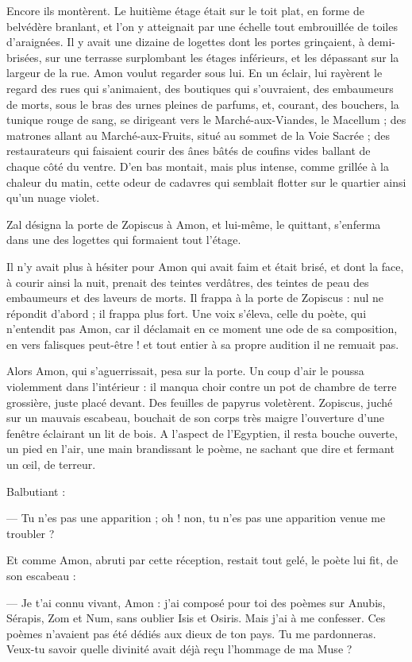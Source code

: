\documentclass[a4paper, 11pt, oneside, polutonikogreek, french]{article}
\begin{document}
Encore ils montèrent. Le huitième étage était sur le toit plat, en forme de belvédère branlant, et l'on y atteignait par une échelle tout embrouillée de toiles d'araignées. Il y avait une dizaine de logettes dont les portes grinçaient, à demi-brisées, sur une terrasse surplombant les étages inférieurs, et les dépassant sur la largeur de la rue. Amon voulut regarder sous lui. En un éclair, lui rayèrent le regard des rues qui s'animaient, des boutiques qui s'ouvraient, des embaumeurs de morts, sous le bras des urnes pleines de parfums, et, courant, des bouchers, la tunique rouge de sang, se dirigeant vers le Marché-aux-Viandes, le Macellum ; des matrones allant au Marché-aux-Fruits, situé au sommet de la Voie Sacrée ; des restaurateurs qui faisaient courir des ânes bâtés de coufins vides ballant de chaque côté du ventre. D'en bas montait, mais plus intense, comme grillée à la chaleur du matin, cette odeur de cadavres qui semblait flotter sur le quartier ainsi qu'un nuage violet.

Zal désigna la porte de Zopiscus à Amon, et lui-même, le quittant, s'enferma dans une des logettes qui formaient tout l'étage.

Il n'y avait plus à hésiter pour Amon qui avait faim et était brisé, et dont la face, à courir ainsi la nuit, prenait des teintes verdâtres, des teintes de peau des embaumeurs et des laveurs de morts. Il frappa à la porte de Zopiscus : nul ne répondit d'abord ; il frappa plus fort. Une voix s'éleva, celle du poète, qui n'entendit pas Amon, car il déclamait en ce moment une ode de sa composition, en vers falisques peut-être ! et tout entier à sa propre audition il ne remuait pas.

Alors Amon, qui s'aguerrissait, pesa sur la porte. Un coup d'air le poussa violemment dans l'intérieur : il manqua choir contre un pot de chambre de terre grossière, juste placé devant. Des feuilles de papyrus voletèrent. Zopiscus, juché sur un mauvais escabeau, bouchait de son corps très maigre l'ouverture d'une fenêtre éclairant un lit de bois. A l'aspect de l'Egyptien, il resta bouche ouverte, un pied en l'air, une main brandissant le poème, ne sachant que dire et fermant un œil, de terreur.

Balbutiant :

--- Tu n'es pas une apparition ; oh ! non, tu n'es pas une apparition venue me troubler ?

Et comme Amon, abruti par cette réception, restait tout gelé, le poète lui fit, de son escabeau :

--- Je t'ai connu vivant, Amon : j'ai composé pour toi des poèmes sur Anubis, Sérapis, Zom et Num, sans oublier Isis et Osiris. Mais j'ai à me confesser. Ces poèmes n'avaient pas été dédiés aux dieux de ton pays. Tu me pardonneras. Veux-tu savoir quelle divinité avait déjà reçu l'hommage de ma Muse ?
\end{document}
